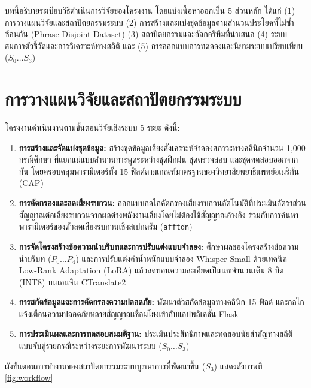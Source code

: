 บทนี้อธิบายระเบียบวิธีดำเนินการวิจัยของโครงงาน โดยแบ่งเนื้อหาออกเป็น 5 ส่วนหลัก ได้แก่ (1) การวางแผนวิจัยและสถาปัตยกรรมระบบ (2) การสร้างและแบ่งชุดข้อมูลตามสำนวนประโยคที่ไม่ซ้ำซ้อนกัน (Phrase-Disjoint Dataset) (3) สถาปัตยกรรมและอัลกอริทึมที่นำเสนอ (4) ระบบสมการตัวชี้วัดและการวิเคราะห์ทางสถิติ และ (5) การออกแบบการทดลองและนิยามระบบเปรียบเทียบ ($S_0 \dots S_3$)

\section{การวางแผนวิจัยและสถาปัตยกรรมระบบ}

โครงงานดำเนินงานตามขั้นตอนวิจัยเชิงระบบ 5 ระยะ ดังนี้:
\begin{enumerate}[label=(\arabic*), leftmargin=*, align=left]
    \item \textbf{การสร้างและจัดแบ่งชุดข้อมูล:} สร้างชุดข้อมูลเสียงสังเคราะห์จำลองสภาวะทางคลินิกจำนวน 1,000 กรณีศึกษา ที่แยกแม่แบบสำนวนการพูดระหว่างชุดฝึกฝน ชุดตรวจสอบ และชุดทดสอบออกจากกัน โดยครอบคลุมพารามิเตอร์ทั้ง 15 ฟิลด์ตามเกณฑ์มาตรฐานของวิทยาลัยพยาธิแพทย์อเมริกัน (CAP) \cite{cap_breast}
    \item \textbf{การคัดกรองและลดเสียงรบกวน:} ออกแบบกลไกคัดกรองเสียงรบกวนอัตโนมัติที่ประเมินอัตราส่วนสัญญาณต่อเสียงรบกวนจากผลต่างพลังงานเสียงโดยไม่ต้องใช้สัญญาณอ้างอิง ร่วมกับการค้นหาพารามิเตอร์ของตัวลดเสียงรบกวนเชิงสเปกตรัม (\texttt{afftdn}) \cite{ffmpeg_afftdn}
    \item \textbf{การจัดโครงสร้างข้อความนำบริบทและการปรับแต่งแบบจำลอง:} ศึกษาผลของโครงสร้างข้อความนำบริบท ($P_0 \dots P_4$) และการปรับแต่งค่าน้ำหนักแบบจำลอง Whisper Small \cite{radford2023whisper} ด้วยเทคนิค Low-Rank Adaptation (LoRA) \cite{hu2021lora} แล้วลดทอนความละเอียดเป็นเลขจำนวนเต็ม 8 บิต (INT8) \cite{jacob2018quantization} บนเอนจิน CTranslate2 \cite{ctranslate2,fasterwhisper}
    \item \textbf{การสกัดข้อมูลและการคัดกรองความปลอดภัย:} พัฒนาตัวสกัดข้อมูลทางคลินิก 15 ฟิลด์ และกลไกแจ้งเตือนความปลอดภัยหลายสัญญาณเชื่อมโยงเข้ากับแอปพลิเคชัน Flask
    \item \textbf{การประเมินผลและการทดสอบสมมติฐาน:} ประเมินประสิทธิภาพและทดสอบนัยสำคัญทางสถิติแบบจับคู่รายกรณีระหว่างระยะการพัฒนาระบบ ($S_0 \dots S_3$)
\end{enumerate}

ผังขั้นตอนการทำงานของสถาปัตยกรรมระบบบูรณาการที่พัฒนาขึ้น ($S_3$) แสดงดังภาพที่ \ref{fig:workflow}

